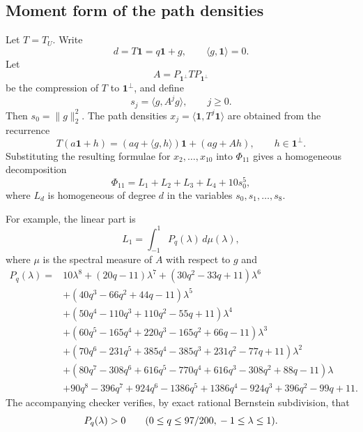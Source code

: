 \documentclass[11pt]{article}
\newcommand{\one}{\mathbf 1}
\begin{document}
\subsection{Moment form of the path densities}

Let $T=T_U$.  Write
\[
        d=T\one=q\one+g,
        \qquad \langle g,\one\rangle=0.
\]
Let
\[
        A=P_{\one^\perp}TP_{\one^\perp}
\]
be the compression of $T$ to $\one^\perp$, and define
\[
        s_j=\langle g,A^jg\rangle,
        \qquad j\ge0.
\]
Then $s_0=\|g\|_2^2$.  The path densities $x_j=\langle \one,T^j\one\rangle$ are obtained from the recurrence
\[
        T(a\one+h)=(aq+\langle g,h\rangle)\one+(ag+Ah),
        \qquad h\in\one^\perp.
\]
Substituting the resulting formulae for $x_2,\ldots,x_{10}$ into $\Phi_{11}$ gives a homogeneous decomposition
\[
        \Phi_{11}=L_1+L_2+L_3+L_4+10s_0^5,
\]
where $L_d$ is homogeneous of degree $d$ in the variables $s_0,s_1,\ldots,s_8$.

For example, the linear part is
\[
        L_1=\int_{-1}^{1}P_q(\lambda)\,d\mu(\lambda),
\]
where $\mu$ is the spectral measure of $A$ with respect to $g$ and
\begin{align*}
P_q(\lambda)={}&10\lambda^8+(20q-11)\lambda^7+(30q^2-33q+11)\lambda^6 \\
&+(40q^3-66q^2+44q-11)\lambda^5 \\
&+(50q^4-110q^3+110q^2-55q+11)\lambda^4 \\
&+(60q^5-165q^4+220q^3-165q^2+66q-11)\lambda^3 \\
&+(70q^6-231q^5+385q^4-385q^3+231q^2-77q+11)\lambda^2 \\
&+(80q^7-308q^6+616q^5-770q^4+616q^3-308q^2+88q-11)\lambda \\
&+90q^8-396q^7+924q^6-1386q^5+1386q^4-924q^3+396q^2-99q+11.
\end{align*}
The accompanying checker verifies, by exact rational Bernstein subdivision, that
\begin{equation}\label{eq:Pq-positive}
        P_q(\lambda)>0
        \qquad
        (0\le q\le97/200,\\ -1\le\lambda\le1).
\end{equation}
\end{document}
